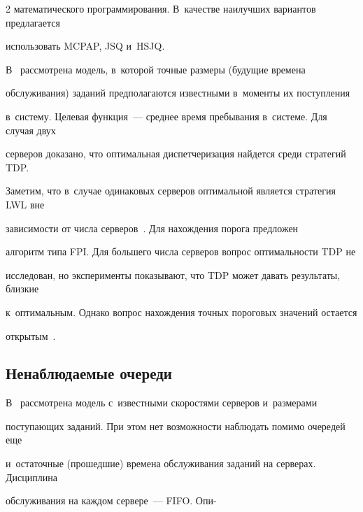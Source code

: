 \begin{multicols}{2}
математического программирования. В~качестве наилучших вариантов предлагается 


использовать MCPAP, JSQ и~HSJQ.


    


    В~\cite{34-kon} рассмотрена модель, в~которой точные размеры (будущие времена 


обслуживания) заданий предполагаются известными в~моменты их поступления 


в~систему. Целевая функция~--- среднее время пребывания в~системе. Для случая двух 


серверов доказано, что оптимальная диспетчеризация найдется среди стратегий TDP. 


Заметим, что в~случае одинаковых серверов оптимальной является стратегия LWL вне 


зависимости от числа серверов~\cite{35-kon, 36-kon}. Для нахождения порога предложен 


алгоритм типа FPI. Для большего числа серверов вопрос оп\-ти\-маль\-ности TDP не 


исследован, но эксперименты показывают, что TDP может давать результаты, близкие 


к~оптимальным. Однако вопрос нахождения точных пороговых значений остается 


открытым~\cite{37-kon}.





\vspace*{-6pt}





\subsection{Ненаблюдаемые очереди}





\vspace*{-2pt}





    В~\cite{15-kon} рассмотрена модель с~известными скоростями серверов и~размерами 


поступающих заданий. При этом нет возможности наблюдать помимо очередей еще 


и~остаточные (прошедшие) времена обслуживания заданий на серверах. Дисциплина 


обслуживания на каждом сервере~--- \mbox{FIFO}. Опи-\linebreak\vspace*{-12pt}






\end{multicols}
